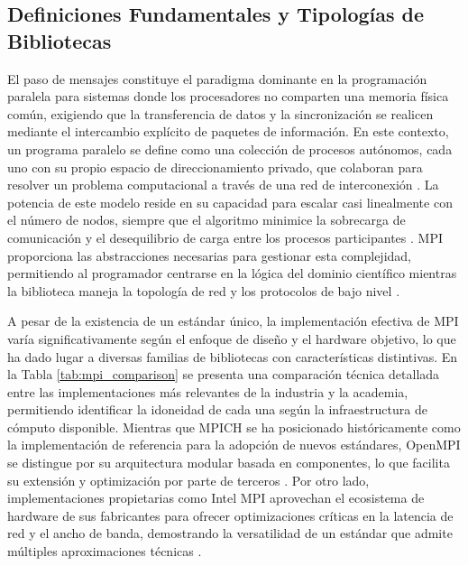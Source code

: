 \subsection{Definiciones Fundamentales y Tipologías de Bibliotecas}

El paso de mensajes constituye el paradigma dominante en la programación paralela para sistemas donde los procesadores no comparten una memoria física común, exigiendo que la transferencia de datos y la sincronización se realicen mediante el intercambio explícito de paquetes de información. En este contexto, un programa paralelo se define como una colección de procesos autónomos, cada uno con su propio espacio de direccionamiento privado, que colaboran para resolver un problema computacional a través de una red de interconexión \cite{ref8_cristian_Nielsen2016, ref9_cristian_Gropp1996}. La potencia de este modelo reside en su capacidad para escalar casi linealmente con el número de nodos, siempre que el algoritmo minimice la sobrecarga de comunicación y el desequilibrio de carga entre los procesos participantes \cite{ref9_cristian_Gropp1996}. MPI proporciona las abstracciones necesarias para gestionar esta complejidad, permitiendo al programador centrarse en la lógica del dominio científico mientras la biblioteca maneja la topología de red y los protocolos de bajo nivel \cite{ref1_cristian_MPIStandard41}.

A pesar de la existencia de un estándar único, la implementación efectiva de MPI varía significativamente según el enfoque de diseño y el hardware objetivo, lo que ha dado lugar a diversas familias de bibliotecas con características distintivas. En la Tabla \ref{tab:mpi_comparison} se presenta una comparación técnica detallada entre las implementaciones más relevantes de la industria y la academia, permitiendo identificar la idoneidad de cada una según la infraestructura de cómputo disponible. Mientras que MPICH se ha posicionado históricamente como la implementación de referencia para la adopción de nuevos estándares, OpenMPI se distingue por su arquitectura modular basada en componentes, lo que facilita su extensión y optimización por parte de terceros \cite{ref5_cristian_Graham2006, ref7_cristian_Squyres2004}. Por otro lado, implementaciones propietarias como Intel MPI aprovechan el ecosistema de hardware de sus fabricantes para ofrecer optimizaciones críticas en la latencia de red y el ancho de banda, demostrando la versatilidad de un estándar que admite múltiples aproximaciones técnicas \cite{ref15_cristian_CARC_MPI_Guide}.

